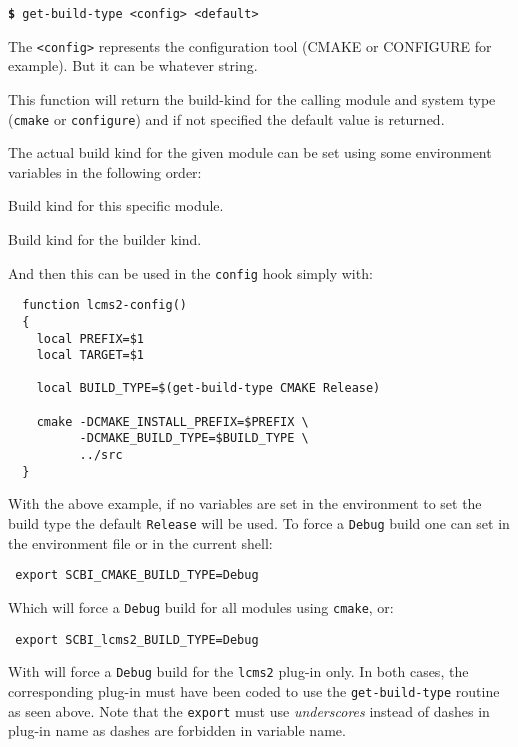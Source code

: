 \documentclass[a4paper,12pt,twoside]{article}
\newcommand{\code}[1]{\texttt{#1}}
\renewcommand{\emph}[1]{\textit{#1}}
\newcommand{\cmd}[1]{\tabto{1cm}\hspace{0.5cm}\texttt{\textbf{\$} #1}}
\begin{document}
\cmd{get-build-type <config> <default>}

The \code{<config>} represents the configuration tool (CMAKE or CONFIGURE for example). But it can be whatever string.

This function will return the build-kind for the calling module and system type (\code{cmake} or \code{configure}) and if not specified the default value is returned.

The actual build kind for the given module can be set using some environment variables in the following order:

\begin{description}[style=nextline]
	\item [SCBI\_<module>\_BUILD\_TYPE] Build kind for this specific module.
	\item [SCBI\_<CONFIG>\_BUILD\_TYPE] Build kind for the builder kind.
\end{description}

And then this can be used in the \code{config} hook simply with:

\begin{lstlisting}
  function lcms2-config()
  {
    local PREFIX=$1
    local TARGET=$1

    local BUILD_TYPE=$(get-build-type CMAKE Release)

    cmake -DCMAKE_INSTALL_PREFIX=$PREFIX \
          -DCMAKE_BUILD_TYPE=$BUILD_TYPE \
          ../src
  }
\end{lstlisting}

With the above example, if no variables are set in the environment to set the build type the default \code{Release} will be used. To force a \code{Debug} build one can set in the environment file or in the current shell:

\begin{lstlisting}
 export SCBI_CMAKE_BUILD_TYPE=Debug
\end{lstlisting}

Which will force a \code{Debug} build for all modules using \code{cmake}, or:

\begin{lstlisting}
 export SCBI_lcms2_BUILD_TYPE=Debug
\end{lstlisting}

With will force a \code{Debug} build for the \code{lcms2} plug-in only. In both cases, the corresponding plug-in must have been coded to use the \code{get-build-type} routine as seen above. Note that the \code{export} must use \emph{underscores} instead of dashes in plug-in name as dashes are forbidden in variable name.
\end{document}

